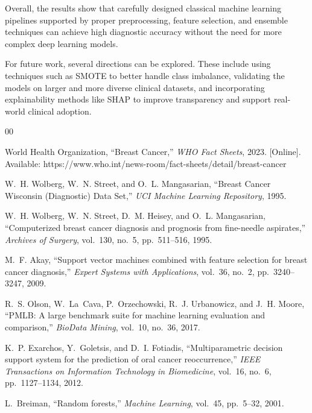 \documentclass[conference]{IEEEtran}
\begin{document}
Overall, the results show that carefully designed classical machine learning pipelines supported by proper preprocessing, feature selection, and ensemble techniques can achieve high diagnostic accuracy without the need for more complex deep learning models.

For future work, several directions can be explored. These include using techniques such as SMOTE to better handle class imbalance, validating the models on larger and more diverse clinical datasets, and incorporating explainability methods like SHAP to improve transparency and support real-world clinical adoption.


\begin{thebibliography}{00}

World Health Organization, ``Breast Cancer,''
\textit{WHO Fact Sheets}, 2023. [Online]. Available:
https://www.who.int/news-room/fact-sheets/detail/breast-cancer

W.~H. Wolberg, W.~N. Street, and O.~L. Mangasarian,
``Breast Cancer Wisconsin (Diagnostic) Data Set,''
\textit{UCI Machine Learning Repository}, 1995.

W.~H. Wolberg, W.~N. Street, D.~M. Heisey, and
O.~L. Mangasarian,
``Computerized breast cancer diagnosis and prognosis from
fine-needle aspirates,''
\textit{Archives of Surgery}, vol.~130, no.~5,
pp.~511--516, 1995.

M.~F. Akay,
``Support vector machines combined with feature selection for
breast cancer diagnosis,''
\textit{Expert Systems with Applications}, vol.~36, no.~2,
pp.~3240--3247, 2009.

R.~S. Olson, W.~La~Cava, P.~Orzechowski, R.~J. Urbanowicz,
and J.~H. Moore,
``PMLB: A large benchmark suite for machine learning evaluation
and comparison,''
\textit{BioData Mining}, vol.~10, no.~36, 2017.

K.~P. Exarchos, Y.~Goletsis, and D.~I. Fotiadis,
``Multiparametric decision support system for the prediction of
oral cancer reoccurrence,''
\textit{IEEE Transactions on Information Technology in
Biomedicine}, vol.~16, no.~6, pp.~1127--1134, 2012.

L.~Breiman,
``Random forests,''
\textit{Machine Learning}, vol.~45, pp.~5--32, 2001.

\end{thebibliography}
\end{document}
